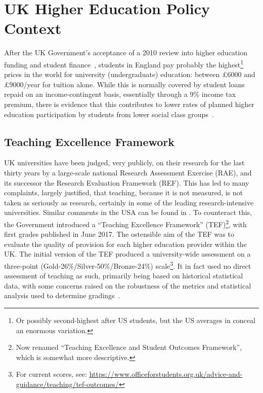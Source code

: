 \documentclass[conference]{IEEEtran}
\begin{document}
\section{UK Higher Education Policy Context}\label{ukhepolicy}

After the UK Government's acceptance of a 2010 review into higher
education funding and student finance~\cite{BIS2010a}, students in
England pay probably the highest\footnote{Or possibly second-highest
after US students, but the US averages in \cite[Table B5.1]{OECD2016a}
conceal an enormous variation.} prices in the world for university
(undergraduate) education: between \pounds6000 and \pounds9000/year
for tuition alone. While this is normally covered by student loans
repaid on an income-contingent basis, essentially through a 9\% income
tax premium, there is evidence that this contributes to lower rates of
planned higher education participation by students from lower social
class groups~\cite{CallenderMason2017a}.

\subsection{Teaching Excellence Framework}

UK universities have been judged, very publicly, on their research for
the last thirty years by a large-scale national Research Assessment
Exercise (RAE), and its successor the Research Evaluation Framework
(REF). This has led to many complaints, largely justified, that
teaching, because it is not measured, is not taken as seriously as
research, certainly in some of the leading research-intensive
universities. Similar comments in the USA can be found in
\cite{Campbelletal2018a}. To counteract this, the Government
introduced a ``Teaching Excellence Framework'' (TEF)\footnote{Now
renamed ``Teaching Excellence and Student Outcomes Framework'', which
is somewhat more descriptive.}, with first grades published in June
2017. The ostensible aim of the TEF was to evaluate the quality of
provision for each higher education provider within the UK. The
initial version of the TEF produced a university-wide assessment on a
three-point (Gold-26\%/Silver-50\%/Bronze-24\%) scale\footnote{For
current scores, see:
\url{https://www.officeforstudents.org.uk/advice-and-guidance/teaching/tef-outcomes/}}. It
in fact used no direct assessment of teaching as such, primarily being
based on historical statistical data, with some concerns raised on the
robustness of the metrics and statistical analysis used to determine
gradings~\cite{gillard:2017}.
\end{document}
